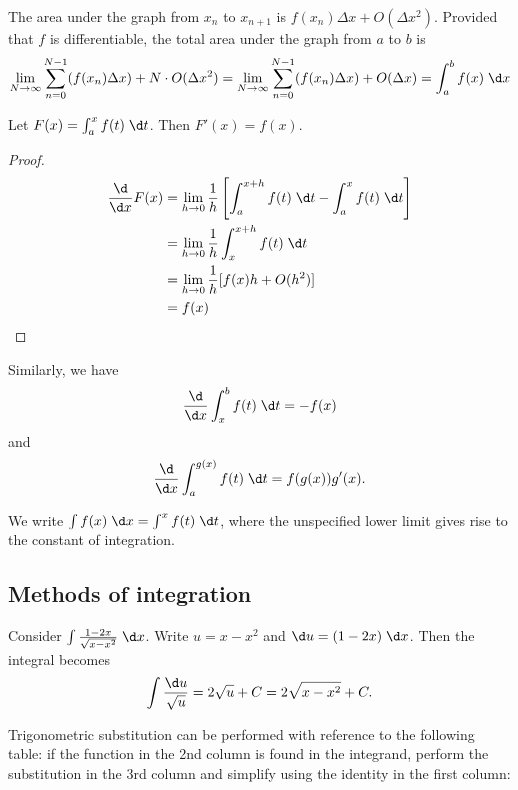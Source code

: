 \documentclass[a4paper]{article}
\begin{document}
The area under the graph from $x_n$ to $x_{n+1}$ is $f(x_n)\Delta x + O(\Delta x^2)$. Provided that $f$ is differentiable, the total area under the graph from $a$ to $b$ is
\[
\lim_{N\to \infty} \sum_{n=0}^{N-1}(f(x_n)\Delta x) + N\cdot O(\Delta x^2) = \lim_{N\to \infty} \sum_{n=0}^{N-1}(f(x_n)\Delta x) + O(\Delta x) = \int_a^b f(x)\;\d x
\]
\begin{thm}
  Let $F(x) = \int_a^x f(t)\;\d t$. Then $F'(x) = f(x)$.
\end{thm}

\begin{proof}
  \begin{align*}
    \frac{\d}{\d x}F(x) &= \lim_{h\to 0}\frac{1}{h}\left[\int_a^{x+h}f(t)\;\d t - \int_a^x f(t)\;\d t\right]\\
    &= \lim_{h\to 0} \frac{1}{h}\int_x^{x+h}f(t) \;\d t\\
    &= \lim_{h\to 0} \frac{1}{h}[f(x)h + O(h^2)]\\
    &= f(x)
  \end{align*}
\end{proof}
Similarly, we have 
\[
\frac{\d}{\d x}\int_x^b f(t)\;\d t = -f(x)
\]
and
\[
\frac{\d}{\d x}\int_a^{g(x)} f(t)\;\d t = f(g(x))g'(x).
\]

\begin{notation}
  We write $\int f(x)\;\d x= \int^x f(t)\;\d t$, where the unspecified lower limit gives rise to the constant of integration.
\end{notation}

\subsection{Methods of integration}
\begin{eg}
  Consider $\int \frac{1 - 2x}{\sqrt{x - x^2}}\;\d x$. Write $u = x - x^2$ and $\d u = (1 - 2x)\;\d x$. Then the integral becomes
\[
\int \frac{\d u}{\sqrt{u}} = 2\sqrt{u} + C = 2\sqrt{x - x^2} + C.
\]
\end{eg}

Trigonometric substitution can be performed with reference to the following table: if the function in the 2nd column is found in the integrand, perform the substitution in the 3rd column and simplify using the identity in the first column:
\end{document}
